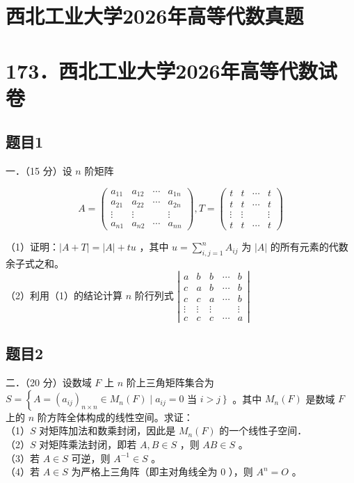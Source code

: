 \documentclass{article}
\begin{document}
\section*{西北工业大学2026年高等代数真题}
\section*{173．西北工业大学2026年高等代数试卷}

\subsection{题目1}
一．（15 分）设 \(n\) 阶矩阵

\[
A=\left(\begin{array}{cccc}
a_{11} & a_{12} & \cdots & a_{1 n} \\
a_{21} & a_{22} & \cdots & a_{2 n} \\
\vdots & \vdots & & \vdots \\
a_{n 1} & a_{n 2} & \cdots & a_{n n}
\end{array}\right), T=\left(\begin{array}{cccc}
t & t & \cdots & t \\
t & t & \cdots & t \\
\vdots & \vdots & & \vdots \\
t & t & \cdots & t
\end{array}\right)
\]

（1）证明：\(|A+T|=|A|+t u\) ，其中 \(u=\sum_{i, j=1}^{n} A_{i j}\) 为 \(|A|\) 的所有元素的代数余子式之和。\\
（2）利用（1）的结论计算 \(n\) 阶行列式 \(\left|\begin{array}{ccccc}a & b & b & \cdots & b \\ c & a & b & \cdots & b \\ c & c & a & \cdots & b \\ \vdots & \vdots & \vdots & & \vdots \\ c & c & c & \cdots & a\end{array}\right|\)

\subsection{题目2}
二．（20 分）设数域 \(F\) 上 \(n\) 阶上三角矩阵集合为 \(S=\left\{A=\left(a_{i j}\right)_{n \times n} \in M_{n}(F) \mid a_{i j}=0\right.\) 当 \(\left.i>j\right\}\) 。其中 \(M_{n}(F)\) 是数域 \(F\) 上的 \(n\) 阶方阵全体构成的线性空间。求证：\\
（1）\(S\) 对矩阵加法和数乘封闭，因此是 \(M_{n}(F)\) 的一个线性子空间．\\
（2）\(S\) 对矩阵乘法封闭，即若 \(A, B \in S\) ，则 \(A B \in S\) 。\\
（3）若 \(A \in S\) 可逆，则 \(A^{-1} \in S\) 。\\
（4）若 \(A \in S\) 为严格上三角阵（即主对角线全为 0 ），则 \(A^{n}=O\) 。
\end{document}
